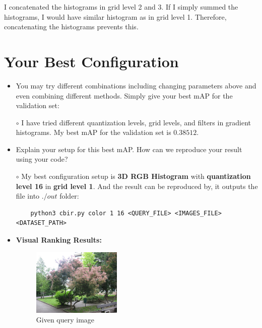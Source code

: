 \documentclass[12pt]{article}
\begin{document}
\qquad I concatenated the histograms in grid level 2 and 3. If I simply summed the histograms, I would have similar histogram as in grid level 1. Therefore, concatenating the histograms prevents this.

\section{Your Best Configuration}
\begin{itemize}
\item You may try different combinations including changing parameters above and even combining different methods. Simply give your best mAP for the validation set:

\item[{$\circ$}] I have tried different quantization levels, grid levels, and filters in gradient histograms. My best mAP for the validation set is \textbf{$0.38512$}.

\item Explain your setup for this best mAP. How can we reproduce your result using your code?

\item[{$\circ$}] My best configuration setup is \textbf{3D RGB Histogram} with \textbf{quantization level 16} in \textbf{grid level 1}. And the result can be reproduced by, it outputs the file into $./out$ folder: \\

\begin{lstlisting}
	python3 cbir.py color 1 16 <QUERY_FILE> <IMAGES_FILE> <DATASET_PATH>
\end{lstlisting}



\item \textbf{Visual Ranking Results:}

\begin{figure}[H]
	\centering
	\includegraphics[width=0.4\textwidth]{eSkXTjAGVt.jpg}
	\caption{Given query image}
\end{figure}


\end{itemize}
\end{document}

